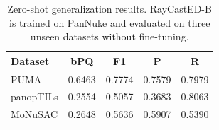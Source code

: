 \begin{table}[H]
	\centering
	\caption{Zero-shot generalization results. RayCastED-B is trained on PanNuke and evaluated on three unseen datasets without fine-tuning.}
	\label{tab:generalization}
	\small
	\begin{tabular}{lcccc}
		\hline
		\textbf{Dataset} & \textbf{bPQ} & \textbf{F1} & \textbf{P} & \textbf{R} \\
		\hline
		PUMA      & 0.6463 & 0.7774 & 0.7579 & 0.7979 \\
		panopTILs & 0.2554 & 0.5057 & 0.3683 & 0.8063 \\
		MoNuSAC   & 0.2648 & 0.5636 & 0.5907 & 0.5390 \\
		\hline
	\end{tabular}
\end{table}
